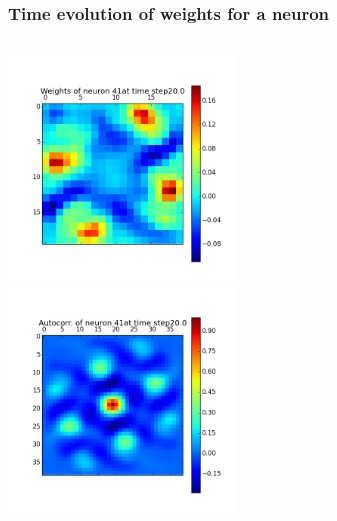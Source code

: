 \begin{frame}
\frametitle{Time evolution of weights for a neuron}
\begin{columns}[t]
\centering
\includegraphics[width=6cm,height=6cm]{neurons/neuron_w_41_t_20.png}\\
\centering
\includegraphics[width=6cm,height=6cm]{neurons/neuron_a_41_t_20.png}\\
\end{columns}
\end{frame}



